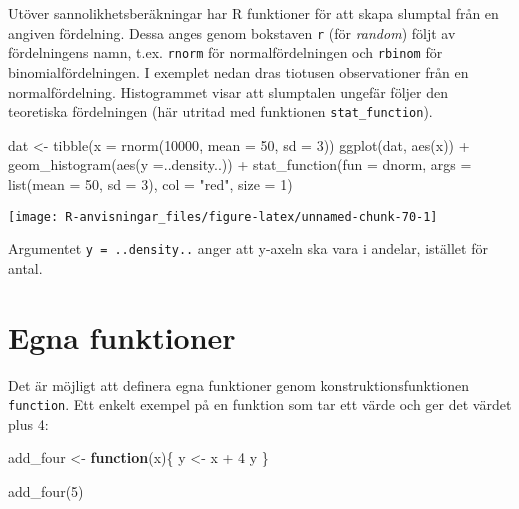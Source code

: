 \documentclass[
]{book}
\newenvironment{Shaded}{\begin{snugshade}}{\end{snugshade}}
\newcommand{\AttributeTok}[1]{\textcolor[rgb]{0.77,0.63,0.00}{#1}}
\newcommand{\ControlFlowTok}[1]{\textcolor[rgb]{0.13,0.29,0.53}{\textbf{#1}}}
\newcommand{\DecValTok}[1]{\textcolor[rgb]{0.00,0.00,0.81}{#1}}
\newcommand{\FunctionTok}[1]{\textcolor[rgb]{0.00,0.00,0.00}{#1}}
\newcommand{\NormalTok}[1]{#1}
\newcommand{\OtherTok}[1]{\textcolor[rgb]{0.56,0.35,0.01}{#1}}
\newcommand{\SpecialCharTok}[1]{\textcolor[rgb]{0.00,0.00,0.00}{#1}}
\newcommand{\StringTok}[1]{\textcolor[rgb]{0.31,0.60,0.02}{#1}}
\theoremstyle{definition}
\theoremstyle{definition}
\theoremstyle{definition}
\theoremstyle{definition}
\theoremstyle{remark}
\begin{document}
Utöver sannolikhetsberäkningar har R funktioner för att skapa slumptal från en angiven fördelning. Dessa anges genom bokstaven \texttt{r} (för \emph{random}) följt av fördelningens namn, t.ex. \texttt{rnorm} för normalfördelningen och \texttt{rbinom} för binomialfördelningen. I exemplet nedan dras tiotusen observationer från en normalfördelning. Histogrammet visar att slumptalen ungefär följer den teoretiska fördelningen (här utritad med funktionen \texttt{stat\_function}).

\begin{Shaded}
\begin{Highlighting}[]
\NormalTok{dat }\OtherTok{\textless{}{-}} \FunctionTok{tibble}\NormalTok{(}\AttributeTok{x =} \FunctionTok{rnorm}\NormalTok{(}\DecValTok{10000}\NormalTok{, }\AttributeTok{mean =} \DecValTok{50}\NormalTok{, }\AttributeTok{sd =} \DecValTok{3}\NormalTok{))}
\FunctionTok{ggplot}\NormalTok{(dat, }\FunctionTok{aes}\NormalTok{(x)) }\SpecialCharTok{+}
  \FunctionTok{geom\_histogram}\NormalTok{(}\FunctionTok{aes}\NormalTok{(}\AttributeTok{y =}\NormalTok{..density..)) }\SpecialCharTok{+}
  \FunctionTok{stat\_function}\NormalTok{(}\AttributeTok{fun =}\NormalTok{ dnorm, }\AttributeTok{args =} \FunctionTok{list}\NormalTok{(}\AttributeTok{mean =} \DecValTok{50}\NormalTok{, }\AttributeTok{sd =} \DecValTok{3}\NormalTok{), }
                \AttributeTok{col =} \StringTok{"red"}\NormalTok{, }\AttributeTok{size =} \DecValTok{1}\NormalTok{)}
\end{Highlighting}
\end{Shaded}

\begin{center}\texttt{[image: R-anvisningar\_files/figure-latex/unnamed-chunk-70-1]} \end{center}

Argumentet \texttt{y\ =\ ..density..} anger att y-axeln ska vara i andelar, istället för antal.

\hypertarget{egna-funktioner}{%
\section{Egna funktioner}\label{egna-funktioner}}

Det är möjligt att definera egna funktioner genom konstruktionsfunktionen \texttt{function}. Ett enkelt exempel på en funktion som tar ett värde och ger det värdet plus 4:

\begin{Shaded}
\begin{Highlighting}[]
\NormalTok{add\_four }\OtherTok{\textless{}{-}} \ControlFlowTok{function}\NormalTok{(x)\{}
\NormalTok{  y }\OtherTok{\textless{}{-}}\NormalTok{ x }\SpecialCharTok{+} \DecValTok{4}
\NormalTok{  y}
\NormalTok{\}}

\FunctionTok{add\_four}\NormalTok{(}\DecValTok{5}\NormalTok{)}
\end{Highlighting}
\end{Shaded}
\end{document}

